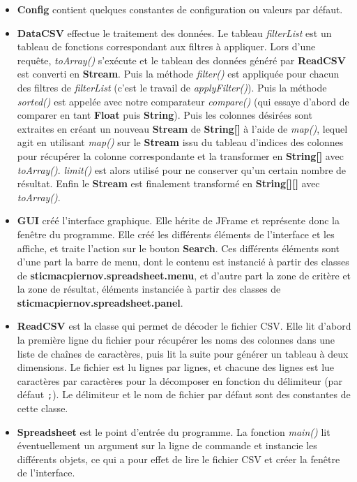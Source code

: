 \documentclass{article}
\begin{document}
\begin{itemize}
  \item \textbf{Config} contient quelques constantes de configuration ou valeurs par défaut.
  \item \textbf{DataCSV} effectue le traitement des données. Le tableau \textit{filterList} est un tableau de fonctions correspondant aux filtres à appliquer. Lors d'une requête, \textit{toArray()} s'exécute et le tableau des données généré par \textbf{ReadCSV} est converti en \textbf{Stream}. Puis la méthode \textit{filter()} est appliquée pour chacun des filtres de \textit{filterList} (c'est le travail de \textit{applyFilter()}). Puis la méthode \textit{sorted()} est appelée avec notre comparateur \textit{compare()} (qui essaye d'abord de comparer en tant \textbf{Float} puis \textbf{String}). Puis les colonnes désirées sont extraites en créant un nouveau \textbf{Stream} de \textbf{String[]} à l'aide de \textit{map()}, lequel agit en utilisant \textit{map()} sur le \textbf{Stream} issu du tableau d'indices des colonnes pour récupérer la colonne correspondante et la transformer en \textbf{String[]} avec \textit{toArray()}. \textit{limit()} est alors utilisé pour ne conserver qu'un certain nombre de résultat. Enfin le \textbf{Stream} est finalement transformé en \textbf{String[][]} avec \textit{toArray()}.
  \item \textbf{GUI} créé l'interface graphique. Elle hérite de JFrame et représente donc la fenêtre du programme. Elle créé les différents éléments de l'interface et les affiche, et traite l'action sur le bouton \textbf{Search}. Ces différents éléments sont d'une part la barre de menu, dont le contenu est instancié à partir des classes de \textbf{sticmacpiernov.spreadsheet.menu}, et d'autre part la zone de critère et la zone de résultat, éléments instanciée à partir des classes de \textbf{sticmacpiernov.spreadsheet.panel}.
  \item \textbf{ReadCSV} est la classe qui permet de décoder le fichier CSV. Elle lit d'abord la première ligne du fichier pour récupérer les noms des colonnes dans une liste de chaînes de caractères, puis lit la suite pour générer un tableau à deux dimensions. Le fichier est lu lignes par lignes, et chacune des lignes est lue caractères par caractères pour la décomposer en fonction du délimiteur (par défaut \texttt{;}). Le délimiteur et le nom de fichier par défaut sont des constantes de cette classe.
  \item \textbf{Spreadsheet} est le point d'entrée du programme. La fonction \textit{main()} lit éventuellement un argument sur la ligne de commande et instancie les différents objets, ce qui a pour effet de lire le fichier CSV et créer la fenêtre de l'interface.
\end{itemize}
\end{document}
